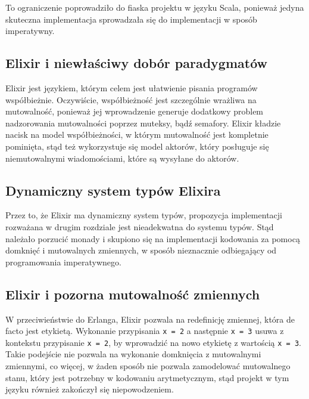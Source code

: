 \documentclass[../praca.tex]{subfiles}
\begin{document}
To ograniczenie poprowadziło do fiaska
projektu w języku Scala, ponieważ jedyna skuteczna implementacja 
sprowadzała się do implementacji 
w sposób imperatywny.

\subsection{Elixir i niewłaściwy dobór paradygmatów}

Elixir jest językiem, którym celem jest ułatwienie pisania programów współbieżnie.
Oczywiście, współbieżność jest szczególnie wrażliwa na mutowalność, ponieważ jej
wprowadzenie generuje dodatkowy problem nadzorowania mutowalności poprzez muteksy,
bądź semafory. Elixir kładzie nacisk na model współbieżności, w którym mutowalność
jest kompletnie pominięta, stąd też wykorzystuje się model aktorów, który posługuje
się niemutowalnymi wiadomościami, które są wysyłane do aktorów.

\subsection{Dynamiczny system typów Elixira}

Przez to, że Elixir ma dynamiczny system typów, propozycja implementacji rozważana 
w drugim rozdziale jest nieadekwatna do systemu typów. Stąd należało porzucić
monady i skupiono się na implementacji kodowania za pomocą domknięć i mutowalnych 
zmiennych, w sposób nieznacznie odbiegający od programowania imperatywnego.

\subsection{Elixir i pozorna mutowalność zmiennych}

W przeciwieństwie do Erlanga, Elixir pozwala na redefinicję zmiennej, która de facto
jest etykietą. Wykonanie przypisania \texttt{x = 2} a następnie \texttt{x = 3}
usuwa z kontekstu przypisanie \texttt{x = 2}, by wprowadzić na nowo etykietę 
z wartością \texttt{x = 3}. Takie podejście nie pozwala na wykonanie 
domknięcia z mutowalnymi zmiennymi, co więcej, w żaden sposób nie pozwala
zamodelować mutowalnego stanu, który jest potrzebny w kodowaniu arytmetycznym, stąd
projekt w tym języku również zakończył się niepowodzeniem.
\end{document}
